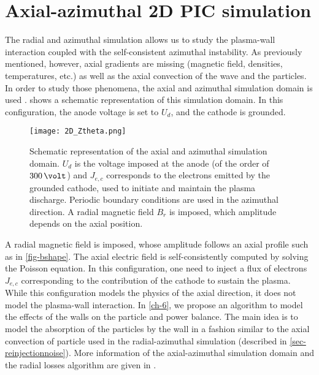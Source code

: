 
\section{Axial-azimuthal \acs{2D} \acs{PIC} simulation}
  \label{sec-axial-azimuthal}
  
  The radial and azimuthal simulation allows us to study the plasma-wall interaction coupled with the self-consistent azimuthal instability.
  As previously mentioned, however, axial gradients are missing (magnetic field, densities, temperatures, etc.) as well as the axial convection of the wave and the particles.
  In order to study those phenomena, the axial and azimuthal simulation domain is used \citep{adam2004,coche2014,lafleur2018,boeuf2018}.
   shows a schematic representation of this simulation domain.
  In this configuration, the anode voltage is set to $U_d$, and the cathode is grounded.
  
  
  
  \begin{figure}[hbt]
    \centering
    \texttt{[image: 2D\_Ztheta.png]}
    \caption{Schematic representation of the axial and azimuthal simulation domain. $U_d$ is the voltage imposed at the anode (of the order of $300\,\volt$) and $J_{e,c}$ corresponds to the electrons emitted by the grounded cathode, used to initiate and maintain the plasma discharge. Periodic boundary conditions are used in the azimuthal direction. A radial magnetic field $B_r$ is imposed, which amplitude depends on the axial position. }
    \label{fig-2Dz}
  \end{figure}
  A radial magnetic field is imposed, whose amplitude follows an axial profile such as in \cref{fig-bshape}.
  The axial electric field is self-consistently computed by solving the Poisson equation.
  In this configuration, one need to inject a flux of electrons $J_{e,c}$ corresponding to the contribution of the cathode to sustain the plasma.
  While this configuration models the physics of the axial direction, it does not model the plasma-wall interaction.
  In \cref{ch-6}, we propose an algorithm to model the effects of the walls on the particle and power balance.
  The main idea is to model the absorption  of the particles by the wall in a fashion similar to the axial convection of particle used in the radial-azimuthal simulation (described in \cref{sec-reinjectionnoise}).
  More information of the axial-azimuthal simulation domain and the radial losses algorithm are given in .
  
  
